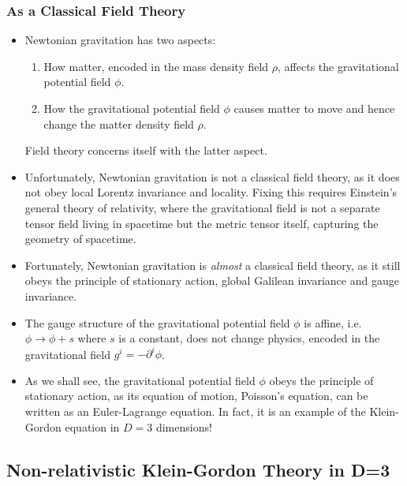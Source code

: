 \documentclass{beamer}
\begin{document}
\begin{frame}
\frametitle{As a Classical Field Theory}

\begin{itemize}
\item Newtonian gravitation has two aspects:
\begin{enumerate}
\item How matter, encoded in the mass density field $\rho$, affects the gravitational potential field $\phi$.

\item How the gravitational potential field $\phi$ causes matter to move and hence change the matter density field $\rho$.
\end{enumerate}

Field theory concerns itself with the latter aspect.

\item Unfortunately, Newtonian gravitation is not a classical field theory, as it does not obey local Lorentz invariance and locality. Fixing this requires Einstein's general theory of relativity, where the gravitational field is not a separate tensor field living in spacetime but the metric tensor itself, capturing the geometry of spacetime.
\end{itemize}
\end{frame}

\begin{frame}
\begin{itemize}
\item Fortunately, Newtonian gravitation is \emph{almost} a classical field theory, as it still obeys the principle of stationary action, global Galilean invariance and gauge invariance.

\item The gauge structure of the gravitational potential field $\phi$ is affine, i.e. $\phi \to \phi + s$ where $s$ is a constant, does not change physics, encoded in the gravitational field $g^i = - \partial^i \phi$.

\item As we shall see, the gravitational potential field $\phi$ obeys the principle of stationary action, as its equation of motion, Poisson's equation, can be written as an Euler-Lagrange equation. In fact, it is an example of the Klein-Gordon equation in $D=3$ dimensions!
\end{itemize}
\end{frame}

\subsection{Non-relativistic Klein-Gordon Theory in D=3}
\end{document}
